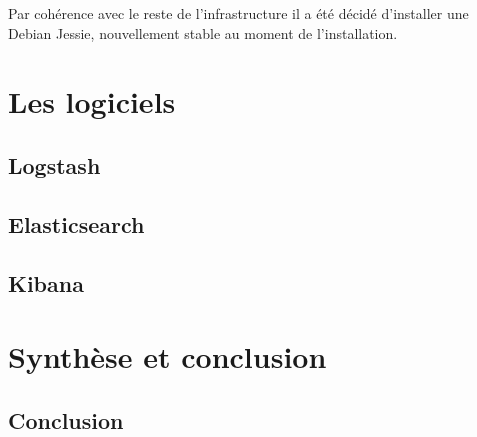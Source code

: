 \documentclass[a4paper,12pt,one side,titlepage]{report}
\begin{document}
Par cohérence avec le reste de l'infrastructure il a été décidé d'installer une 
Debian Jessie, nouvellement stable au moment de l'installation.
%
%
%
%

\part{Les logiciels}
\chapter{Logstash}


\chapter{Elasticsearch}


\chapter{Kibana}


\part{Synthèse et conclusion}

\chapter{Conclusion}
\end{document}
